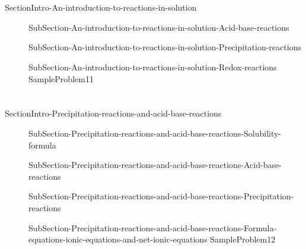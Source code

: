 \documentclass[main.tex]{subfiles} %
\newcommand\chapterlabel{Ch-electrolytes}\setcounter{figurenewcounter}{0}\setcounter{tablenewcounter}{0}\setcounter{formulanewcounter}{0}
\begin{document}
\section{\color{blue!30!black}{An introduction to reactions in solution}}
{SectionIntro-An-introduction-to-reactions-in-solution}
\sloppy \begin{description}
\item[] {SubSection-An-introduction-to-reactions-in-solution-Acid-base-reactions}
\item[]{SubSection-An-introduction-to-reactions-in-solution-Precipitation-reactions}
\item[]{SubSection-An-introduction-to-reactions-in-solution-Redox-reactions}
{SampleProblem11}
\end{description}

\section{\color{blue!30!black}{Precipitation reactions and acid-base reactions}}
{SectionIntro-Precipitation-reactions-and-acid-base-reactions}
\sloppy \begin{description}
\item[] {SubSection-Precipitation-reactions-and-acid-base-reactions-Solubility-formula}
\item[]{SubSection-Precipitation-reactions-and-acid-base-reactions-Acid-base-reactions}
\item[] {SubSection-Precipitation-reactions-and-acid-base-reactions-Precipitation-reactions}
\item[]{SubSection-Precipitation-reactions-and-acid-base-reactions-Formula-equations-ionic-equations-and-net-ionic-equations}%
{SampleProblem12}%
\end{description}

\end{document}
